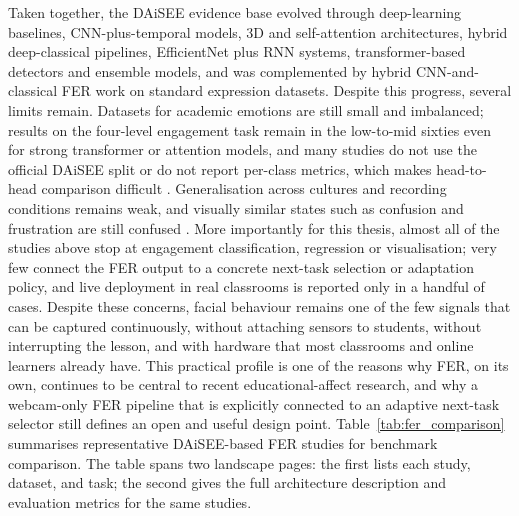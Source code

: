 Taken together, the \ac{DAiSEE} evidence base evolved through deep-learning baselines, \ac{CNN}-plus-temporal models, 3D and self-attention architectures, hybrid deep-classical pipelines, EfficientNet plus RNN systems, transformer-based detectors and ensemble models, and was complemented by hybrid \ac{CNN}-and-classical \ac{FER} work on standard expression datasets. Despite this progress, several limits remain. Datasets for academic emotions are still small and imbalanced; results on the four-level engagement task remain in the low-to-mid sixties even for strong transformer or attention models, and many studies do not use the official \ac{DAiSEE} split or do not report per-class metrics, which makes head-to-head comparison difficult \cite{abedi_improving_2021,santoni_convolutional_2023,rianto_engagement_2025,shiri_detection_2024,su_leveraging_2024}. Generalisation across cultures and recording conditions remains weak, and visually similar states such as confusion and frustration are still confused \cite{lek_academic_2023,florestiyanto_emotion_2024,vistorte_integrating_2024}. More importantly for this thesis, almost all of the studies above stop at engagement classification, regression or visualisation; very few connect the \ac{FER} output to a concrete next-task selection or adaptation policy, and live deployment in real classrooms is reported only in a handful of cases. Despite these concerns, facial behaviour remains one of the few signals that can be captured continuously, without attaching sensors to students, without interrupting the lesson, and with hardware that most classrooms and online learners already have. This practical profile is one of the reasons why \ac{FER}, on its own, continues to be central to recent educational-affect research, and why a webcam-only \ac{FER} pipeline that is explicitly connected to an adaptive next-task selector still defines an open and useful design point. Table~\ref{tab:fer_comparison} summarises representative \ac{DAiSEE}-based \ac{FER} studies for benchmark comparison. The table spans two landscape pages: the first lists each study, dataset, and task; the second gives the full architecture description and evaluation metrics for the same studies.



